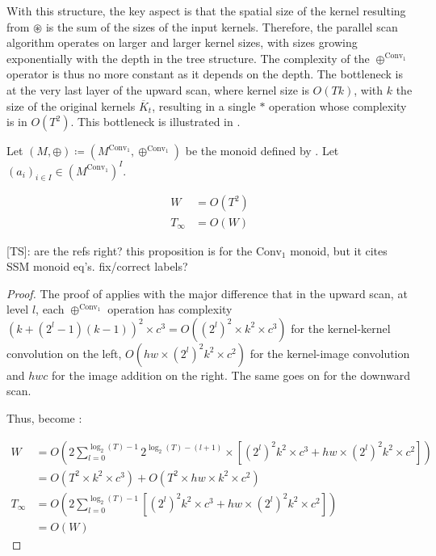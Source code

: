 \documentclass{article}
\newcommand{\TS}[1]{{\color{pink}[TS]: #1}}
\begin{document}
With this structure, the key aspect is that the spatial size of the kernel resulting from $\circledast$ is the sum of the sizes of the input kernels. Therefore, the parallel scan algorithm operates on larger and larger kernel sizes, with sizes growing exponentially with the depth in the tree structure. The complexity of the $\oplus^{\mathrm{Conv}_1}$ operator is thus no more constant as it depends on the depth. The bottleneck is at the very last layer of the upward scan, where kernel size is $O(Tk)$, with $k$ the size of the original kernels $\overline{K}_t$, resulting in a single $\ast$ operation whose complexity is in $O(T^2)$. This bottleneck is illustrated in .

\begin{proposition}
    Let $(M, \oplus) \coloneqq (M^{\mathrm{Conv}_1}, \oplus^{\mathrm{Conv}_1})$ be the monoid defined by . Let $(a_i)_{i\in I}\in (M^{\mathrm{Conv}_1})^I$.

\begin{align}
    W&= O(T^2)\\
    T_\infty&= O(W)
\end{align}
\end{proposition}
\TS{are the refs right? this proposition is for the Conv$_1$ monoid, but it cites SSM monoid eq’s. fix/correct labels?}

\begin{proof}
The proof of  applies with the major difference that in the upward scan, at level $l$, each $\oplus^{\mathrm{Conv}_1}$ operation has complexity $(k+(2^l-1)(k-1))^2 \times c^3 = O((2^l)^2\times k^2 \times c^3)$ for the kernel-kernel convolution on the left, $O(h w \times (2^l)^2 k^2 \times c^2)$ for the kernel-image convolution and $h w c$ for the image addition on the right. The same goes on for the downward scan.

Thus,  become :

\begin{align}
\label{eq:W_conv}
W &= O(2 \sum_{l=0}^{\log_2(T)-1} 2^{\log_2(T)-(l+1)} \times \left[ (2^l)^2 k^2 \times c^3 + h w \times (2^l)^2 k^2 \times c^2\right])\\
&= O(T^2 \times k^2 \times c^3) + O(T^2 \times h w \times k^2 \times c^2)\\
\label{eq:T_conv}
T_\infty&= O(2\sum_{l=0}^{\log_2(T)-1} \left[ (2^l)^2 k^2 \times c^3 + h w \times (2^l)^2 k^2 \times c^2\right])\\
&= O(W)
\end{align}
\end{proof}
\end{document}
